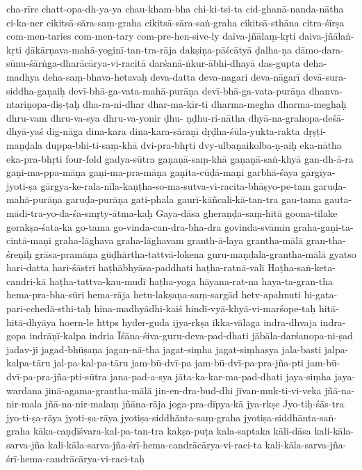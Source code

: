 {cha-rīre
chatt-opa-dh-ya-ya
chau-kham-bha
chi-ki-tsi-ta
cid-ghanā-nanda-nātha
ci-ka-ner
cikitsā-sāra-saṃ-graha
cikitsā-sāra-saṅ-graha 
cikitsā-sthāna
    citra-śīrṣa
com-men-taries
com-men-tary
com-pre-hen-sive-ly
daiva-jñālaṃ-kṛti
daiva-jñālaṅ-kṛti
    ḍākārṇava-mahā-yoginī-tan-tra-rāja
dakṣiṇa-pāścātyā
ḍalha-ṇa
dāmo-dara-sūnu-śārṅga-dharācārya-vi-racitā
darśanā-ṅkur-ābhi-dhayā
das-gupta
deha-madhya
deha-saṃ-bhava-hetavaḥ
deva-datta
deva-nagari
deva-nāgarī
devā-sura-siddha-gaṇaiḥ
devī-bhā-ga-vata-mahā-purāṇa
devī-bhā-ga-vata-purāṇa
dhanva-ntariṇopa-diṣ-ṭaḥ
dha-ra-ni-dhar
    dhar-ma-kīr-ti
dharma-megha
dharma-meghaḥ
dhru-vam
dhru-va-sya
dhru-va-yonir
ḍhu- ṇḍhu-ri-nātha
dhyā-na-grahopa-deśā-dhyā-yaś
    dig-nāga
dina-kara
dina-kara-sāraṇī
dṛḍha-śūla-yukta-rakta
dṛṣṭi-maṇḍala
duppa-bhi-ti-saṃ-khā
dvi-pra-bhṛti
dvy-ulbaṇaikolba-ṇ-aiḥ
eka-nātha
eka-pra-bhṛti
four-fold
    gadya-sūtra
gaṇaṇā-saṃ-khā
gaṇaṇā-saṅ-khyā
gan-dh-ā-ra
gaṇi-ma-ppa-māṇa
gaṇi-ma-pra-māṇa
gaṇita-cūḍā-maṇi
    garbhā-śaya
gārgīya-jyoti-ṣa
gārgya-ke-rala-nīla-kaṇṭha-so-ma-sutva-vi-racita-bhāṣyo-pe-tam
garuḍa-mahā-purāṇa
garuḍa-purāṇa
gati-phala
gaurī-kāñcali-kā-tan-tra
gau-tama
gauta-mādi-tra-yo-da-śa-smṛty-ātma-kaḥ
Gaya-dāsa
gheraṇḍa-saṃ-hitā
goona-tilake
gorakṣa-śata-ka
go-tama
go-vinda-can-dra-bha-dra
govinda-svāmin
graha-gaṇi-ta-cintā-maṇi
graha-lāghava
graha-lāghavam
granth-ā-laya
grantha-mālā
gran-tha-śreṇiḥ
grāsa-pramāṇa
    gūḍhārtha-tattvā-lokena
guru-maṇḍala-grantha-mālā
gyatso
hari-datta
hari-śāstrī
haṭhābhyāsa-paddhati
haṭha-ratnā-valī
Haṭha-saṅ-keta-candri-kā
haṭha-tattva-kau-mudī
haṭha-yoga
hāyana-rat-na
haya-ta-gran-tha
hema-pra-bha-sūri
hema-rāja
hetu-lakṣaṇa-saṃ-sargād
hetv-apahnuti
    hi-gata-pari-cchedā-sthi-taḥ 
hīna-madhyādhi-kaiś
hindī-vyā-khyā-vi-marśope-taḥ
    hitā-hitā-dhyāya
hoern-le
https
hyder-guda
ijya-rkṣa
ikka-vālaga
indra-dhvaja
indra-gopa
indrāṇī-kalpa
indria
Īśāna-śiva-guru-deva-pad-dhati
jābāla-darśanopa-ni-ṣad
jadav-ji
jagad-bhūṣaṇa
jagan-nā-tha
jagat-siṃha
jagat-siṃhasya
jala-basti
        jalpa-kalpa-tāru
jal-pa-kal-pa-tāru
jam-bū-dvī-pa
jam-bū-dvī-pa-pra-jña-pti
jam-bū-dvī-pa-pra-jña-pti-sūtra
jana-pad-a-sya
jāta-ka-kar-ma-pad-dhati
jaya-siṃha
jaya-wardana
jinā-agama-grantha-mālā
jin-en-dra-bud-dhi
jīvan-muk-ti-vi-veka
jñā-na-nir-mala
jñā-na-nir-malaṃ
jñāna-rāja
joga-pra-dīpya-kā
jya-rkṣe
Jyo-tiḥ-śās-tra
jyo-ti-ṣa-rāya
jyoti-ṣa-rāya
jyotiṣa-siddhānta-saṃ-graha
jyotiṣa-siddhānta-saṅ-graha
kāka-caṇḍīśvara-kal-pa-tan-tra
kakṣa-puṭa
kala-saptaka
kāli-dāsa
kali-kāla-sarva-jña
kali-kāla-sarva-jña-śrī-hema-candrācārya-vi-raci-ta
kali-kāla-sarva-jña-śrī-hema-candrācārya-vi-raci-taḥ
}
